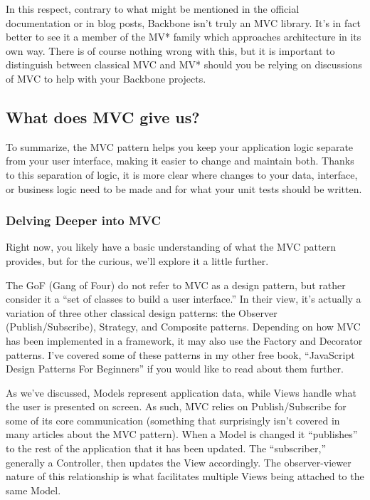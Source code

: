 \documentclass[9pt]{book}
\begin{document}
In this respect, contrary to what might be mentioned in the official
documentation or in blog posts, Backbone isn't truly an MVC library.
It's in fact better to see it a member of the MV* family which
approaches architecture in its own way. There is of course nothing wrong
with this, but it is important to distinguish between classical MVC and
MV* should you be relying on discussions of MVC to help with your
Backbone projects.

\subsection{What does MVC give us?}\label{what-does-mvc-give-us}

To summarize, the MVC pattern helps you keep your application logic
separate from your user interface, making it easier to change and
maintain both. Thanks to this separation of logic, it is more clear
where changes to your data, interface, or business logic need to be made
and for what your unit tests should be written.

\subsubsection{Delving Deeper into MVC}\label{delving-deeper-into-mvc}

Right now, you likely have a basic understanding of what the MVC pattern
provides, but for the curious, we'll explore it a little further.

The GoF (Gang of Four) do not refer to MVC as a design pattern, but
rather consider it a ``set of classes to build a user interface.'' In
their view, it's actually a variation of three other classical design
patterns: the Observer (Publish/Subscribe), Strategy, and Composite
patterns. Depending on how MVC has been implemented in a framework, it
may also use the Factory and Decorator patterns. I've covered some of
these patterns in my other free book, ``JavaScript Design Patterns For
Beginners'' if you would like to read about them further.

As we've discussed, Models represent application data, while Views
handle what the user is presented on screen. As such, MVC relies on
Publish/Subscribe for some of its core communication (something that
surprisingly isn't covered in many articles about the MVC pattern). When
a Model is changed it ``publishes'' to the rest of the application that
it has been updated. The ``subscriber,'' generally a Controller, then
updates the View accordingly. The observer-viewer nature of this
relationship is what facilitates multiple Views being attached to the
same Model.
\end{document}
